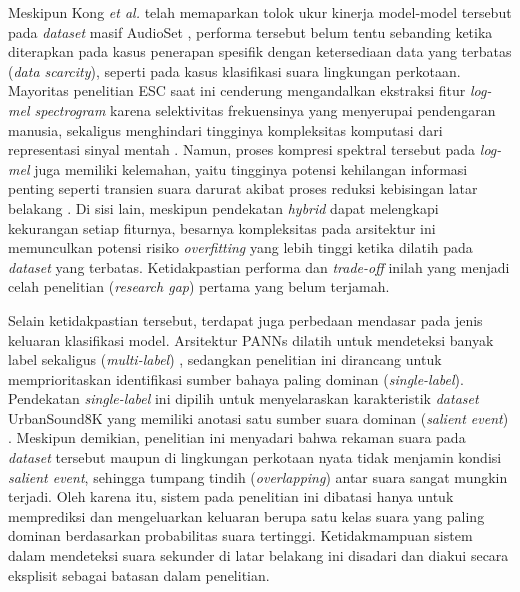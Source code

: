 Meskipun Kong \textit{et al.} \cite{kong2020panns} telah memaparkan tolok ukur kinerja model-model tersebut pada \textit{dataset} masif AudioSet \cite{gemmeke2017audioset}, performa tersebut belum tentu sebanding ketika diterapkan pada kasus penerapan spesifik dengan ketersediaan data yang terbatas (\textit{data scarcity}), seperti pada kasus klasifikasi suara lingkungan perkotaan.
Mayoritas penelitian ESC saat ini cenderung mengandalkan ekstraksi fitur \textit{log-mel spectrogram} karena selektivitas frekuensinya yang menyerupai pendengaran manusia, sekaligus menghindari tingginya kompleksitas komputasi dari representasi sinyal mentah \cite{salamon2017deep,huzaifah2017}.
Namun, proses kompresi spektral tersebut pada \textit{log-mel} juga memiliki kelemahan, yaitu tingginya potensi kehilangan informasi penting seperti transien suara darurat akibat proses reduksi kebisingan latar belakang \cite{tokozume2017envnet, dai2017}.
Di sisi lain, meskipun pendekatan \textit{hybrid} dapat melengkapi kekurangan setiap fiturnya, besarnya kompleksitas pada arsitektur ini memunculkan potensi risiko \textit{overfitting} yang lebih tinggi ketika dilatih pada \textit{dataset} yang terbatas.
Ketidakpastian performa dan \textit{trade-off} inilah yang menjadi celah penelitian (\textit{research gap}) pertama yang belum terjamah. \par

Selain ketidakpastian tersebut, terdapat juga perbedaan mendasar pada jenis keluaran klasifikasi model. 
Arsitektur PANNs dilatih untuk mendeteksi banyak label sekaligus (\textit{multi-label}) \cite{kong2020panns}, sedangkan penelitian ini dirancang untuk memprioritaskan identifikasi sumber bahaya paling dominan (\textit{single-label}).
Pendekatan \textit{single-label} ini dipilih untuk menyelaraskan karakteristik \textit{dataset} UrbanSound8K yang memiliki anotasi satu sumber suara dominan (\textit{salient event}) \cite{salamon2014dataset}.
Meskipun demikian, penelitian ini menyadari bahwa rekaman suara pada \textit{dataset} tersebut maupun di lingkungan perkotaan nyata tidak menjamin kondisi \textit{salient event}, sehingga tumpang tindih (\textit{overlapping}) antar suara sangat mungkin terjadi. 
Oleh karena itu, sistem pada penelitian ini dibatasi hanya untuk memprediksi dan mengeluarkan keluaran berupa satu kelas suara yang paling dominan berdasarkan probabilitas suara tertinggi.
Ketidakmampuan sistem dalam mendeteksi suara sekunder di latar belakang ini disadari dan diakui secara eksplisit sebagai batasan dalam penelitian.

